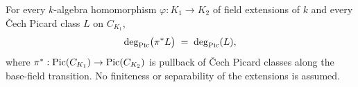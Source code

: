 \begin{theorem}
  \label{pa-thm:classDeg_cechPicMap_baseFieldTransition}
  \leanok

  For every \(k\)-algebra homomorphism \(\varphi : K_1 \to K_2\) of field extensions of
  \(k\) and every \v Cech Picard class \(L\) on \(C_{K_1}\),
  \[
    \deg_{\operatorname{Pic}}\bigl(\pi^{*}L\bigr) \;=\; \deg_{\operatorname{Pic}}(L),
  \]
  where \(\pi^{*} : \operatorname{Pic}(C_{K_1}) \to \operatorname{Pic}(C_{K_2})\) is pullback of \v Cech Picard
  classes along the base-field transition. No finiteness or separability of the
  extensions is assumed.
\end{theorem}
